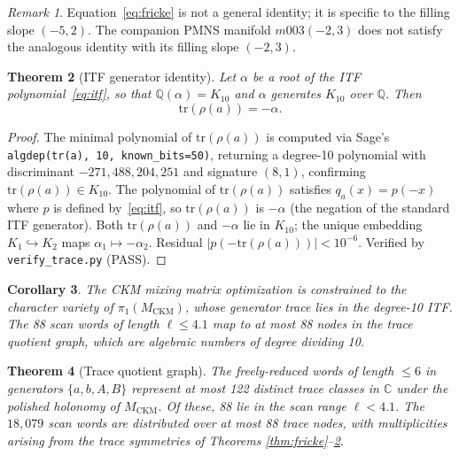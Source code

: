 \documentclass[11pt,a4paper]{article}
\newtheorem{theorem}{Theorem}
\newtheorem{corollary}[theorem]{Corollary}
\theoremstyle{remark}
\newtheorem{remark}[theorem]{Remark}
\newcommand{\MCKM}{M_{\mathrm{CKM}}}
\newcommand{\QQ}{\mathbb{Q}}
\newcommand{\CC}{\mathbb{C}}
\newcommand{\Kten}{K_{10}}
\begin{document}
\begin{remark}
Equation~\eqref{eq:fricke} is not a general identity;
it is specific to the filling slope $(-5,2)$.
The companion PMNS manifold $m003(-2,3)$ does not satisfy the
analogous identity with its filling slope $(-2,3)$.
\end{remark}

\begin{theorem}[ITF generator identity]
\label{thm:itf}
Let $\alpha$ be a root of the ITF polynomial~\eqref{eq:itf}, so that
$\QQ(\alpha) = \Kten$ and $\alpha$ generates $\Kten$ over $\QQ$.
Then
\begin{equation}
\mathrm{tr}(\rho(a)) = -\alpha.
\label{eq:tra}
\end{equation}
\end{theorem}

\begin{proof}
The minimal polynomial of $\mathrm{tr}(\rho(a))$ is computed via
Sage's \texttt{algdep(tr(a), 10, known\_bits=50)}, returning a
degree-10 polynomial with discriminant $-271{,}488{,}204{,}251$ and
signature $(8,1)$, confirming $\mathrm{tr}(\rho(a)) \in \Kten$.
The polynomial of $\mathrm{tr}(\rho(a))$ satisfies
$q_a(x) = p(-x)$ where $p$ is defined by~\eqref{eq:itf},
so $\mathrm{tr}(\rho(a))$ is $-\alpha$ (the negation of the standard
ITF generator).
Both $\mathrm{tr}(\rho(a))$ and $-\alpha$ lie in $\Kten$; the unique
embedding $K_1 \hookrightarrow K_2$ maps $\alpha_1 \mapsto -\alpha_2$.
Residual $|p(-\mathrm{tr}(\rho(a)))| < 10^{-6}$.
Verified by \texttt{verify\_trace.py} (PASS).
\end{proof}

\begin{corollary}
The CKM mixing matrix optimization is constrained to the character
variety of $\pi_1(\MCKM)$, whose generator trace lies in the degree-10
ITF.
The 88 scan words of length $\ell \leq 4.1$ map to at most 88 nodes
in the trace quotient graph, which are algebraic numbers of degree
dividing 10.
\end{corollary}

\begin{theorem}[Trace quotient graph]
\label{thm:quotient}
The freely-reduced words of length $\leq 6$ in generators
$\{a, b, A, B\}$ represent at most \emph{122 distinct trace classes}
in $\CC$ under the polished holonomy of $\MCKM$.
Of these, 88 lie in the scan range $\ell < 4.1$.
The $18{,}079$ scan words are distributed over at most 88 trace nodes,
with multiplicities arising from the trace symmetries of Theorems
\ref{thm:fricke}--\ref{thm:itf}.
\end{theorem}
\end{document}
